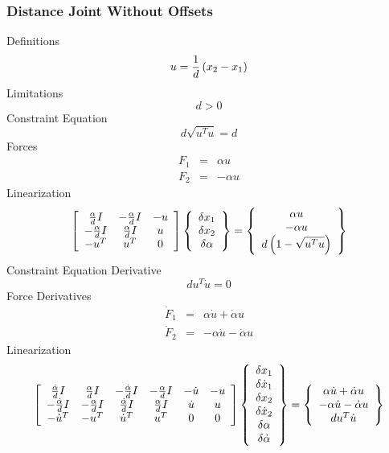 \documentclass[10pt,dvips]{report}
\begin{document}
\subsubsection{Distance Joint Without Offsets}
Definitions
\begin{displaymath}
	u = \frac{1}{d}\plbr{x_2 - x_1}
\end{displaymath}
Limitations
\begin{displaymath}
	d > 0
\end{displaymath}
Constraint Equation
\begin{displaymath}
	d \sqrt{u^T u} = d
\end{displaymath}
Forces
\begin{eqnarray*}
	F_1 & = & \alpha u \\
	F_2 & = & -\alpha u
\end{eqnarray*}
Linearization
\begin{displaymath}
	\sqbr{\matr{ccc}{
		\frac{\alpha}{d}I & -\frac{\alpha}{d}I & -u \\
		-\frac{\alpha}{d}I & \frac{\alpha}{d}I & u \\
		-u^T & u^T & 0
	}}\cubr{\cvvect{
		\delta{x_1} \\
		\delta{x_2} \\
		\delta{\alpha}
	}} = \cubr{\cvvect{
		\alpha u \\
		- \alpha u \\
		d\plbr{1 - \sqrt{u^T u}}
	}}
\end{displaymath}
Constraint Equation Derivative
\begin{displaymath}
	d u^T \dot{u} = 0
\end{displaymath}
Force Derivatives
\begin{eqnarray*}
	\dot{F}_1 & = & \alpha \dot{u} + \dot{\alpha} u \\
	\dot{F}_2 & = & -\alpha \dot{u} - \dot{\alpha} u
\end{eqnarray*}
Linearization
\begin{displaymath}
        \sqbr{\matr{cccccc}{
		\frac{\dot{\alpha}}{d}I & \frac{\alpha}{d}I &
			-\frac{\dot{\alpha}}{d}I & -\frac{\alpha}{d}I &
			-\dot{u} & -u \\
		-\frac{\dot{\alpha}}{d}I & -\frac{\alpha}{d}I &
			\frac{\dot{\alpha}}{d}I & \frac{\alpha}{d}I &
			\dot{u} & u \\
		-\dot{u}^T & -u^T & \dot{u}^T & u^T & 0 & 0
	}}\cubr{\cvvect{
		\delta{x_1} \\
		\delta{\dot{x}_1} \\
		\delta{x_2} \\
		\delta{\dot{x}_2} \\
		\delta{\alpha} \\
		\delta{\dot{\alpha}}
	}} = \cubr{\cvvect{
		\alpha \dot{u} + \dot{\alpha} u \\
		-\alpha \dot{u} - \dot{\alpha} u \\
		d u^T \dot{u}
	}}
\end{displaymath}
\end{document}
